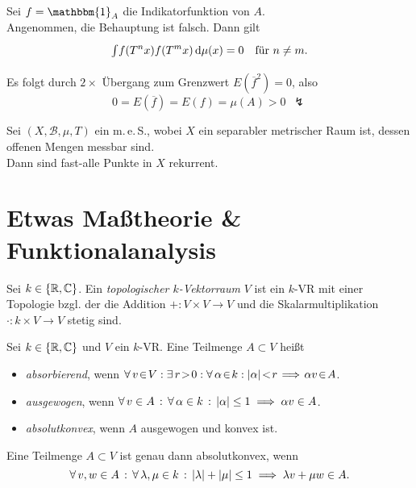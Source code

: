 \documentclass{cheat-sheet}
\newcommand{\Bor}{\mathcal{B}} %
\newcommand{\meS}{m.\,e.\,S.} %
\newcommand{\meST}{$(X, \Bor, \mu, T)$} %
\newcommand{\ind}{\mathbbm{1}} %
\begin{document}
\begin{beweis}
  Sei $f = \ind_A$ die Indikatorfunktion von $A$. \\
  Angenommen, die Behauptung ist falsch. Dann gilt
  \[
    {\textstyle \int\limits_{}^{}} f(T^n x)f(T^m x) \,\mathrm{d} \mu(x) = 0 \quad
    \text{für $n \neq m$.}
  \]
  Es folgt durch $2 \times$ Übergang zum Grenzwert $E(\overline{f}^2) = 0$, also
  \[ 0 = E(\overline{f}) = E(f) = \mu(A) > 0 \enspace \lightning \]
\end{beweis}

\begin{thm}
  Sei \meST{} ein \meS{}, wobei $X$ ein separabler metrischer Raum ist, dessen offenen Mengen messbar sind. \\
  Dann sind fast-alle Punkte in $X$ rekurrent.
\end{thm}

\section{Etwas Maßtheorie \& Funktionalanalysis}

\begin{defn}
  Sei $k \in \{ \mathbb{R}, \mathbb{C} \}$.
  Ein \emph{topologischer $k$-Vektorraum} $V$ ist ein $k$-VR mit einer Topologie bzgl. der die Addition $+ : V \times V \to V$ und die Skalarmultiplikation $\cdot : k \times V \to V$ stetig sind.
\end{defn}

\begin{defn}
  Sei $k \in \{ \mathbb{R}, \mathbb{C} \}$ und $V$ ein $k$-VR.
  Eine Teilmenge $A \subset V$ heißt
  \begin{itemize}
    \item \emph{absorbierend}, wenn
    $\fa{v \!\in\! V\!}\! \ex{r \!>\! 0\!}\! \fa{\alpha \!\in\! k\!}\! \abs{\alpha} \!<\! r \!\implies\! \alpha v \!\in\! A$.
    \item \emph{ausgewogen}, wenn $\forall \, {v \in A} \,:\, \forall \, {\alpha \in k} \,:\, \lvert\alpha\rvert \leq 1 \implies \alpha v \in A$.
    \item \emph{absolutkonvex}, wenn $A$ ausgewogen und konvex ist.
  \end{itemize}
\end{defn}

\begin{lem}
  Eine Teilmenge $A \!\subset\! V$ ist genau dann absolutkonvex, wenn
  \[ \forall \, {v, w \in A} \,:\, \forall \, {\lambda, \mu \in k} \,:\, \lvert\lambda\rvert + \lvert\mu\rvert \leq 1 \implies \lambda v + \mu w \in A. \]
\end{lem}
\end{document}
